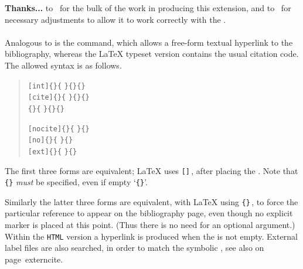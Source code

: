 \medskip
\noindent\textbf{Thanks...} to \Wilck\ for the bulk of the work 
in producing this extension, and to \RossMoore\ for 
necessary adjustments to allow it to work correctly with the 
.


%
\paragraph*{\label{hypercite}}
Analogous to  is the  command,
which allows a free-form textual hyperlink to the bibliography,
whereas the \LaTeX{} typeset version contains the usual citation code.
The allowed syntax is as follows.
\begin{small}
\begin{quote}
\verb|[int]{|\verb|}{|%
\verb|}{|\verb|}{|\verb|}|\\
\verb|[cite]{|\verb|}{|%
\verb|}{|\verb|}{|\verb|}|\\
\verb|{|\verb|}{|%
\verb|}{|\verb|}{|\verb|}|\medskip

\verb|[nocite]{|\verb|}{|%
\verb|}{|\verb|}|\\
\verb|[no]{|\verb|}{|%
\verb|}{|\verb|}|\\
\verb|[ext]{|\verb|}{|%
\verb|}{|\verb|}|
\end{quote}
\end{small}
The first three forms are equivalent; 
\LaTeX{} uses \verb|[|\verb|]|\,,
after placing the .
Note that \verb|{|\verb|}| \emph{must} be specified, 
even if empty `\verb|{}|'.

Similarly the latter three forms are equivalent, 
with \LaTeX{} using \verb|{|\verb|}|\,, 
to force the particular reference to appear on the bibliography page, 
even though no explicit marker is placed at this point.
(Thus there is no need for an optional   argument.)\html{\\}
Within the \texttt{HTML} version a hyperlink is produced when the  
is not empty. External label files are also searched, 
in order to match the symbolic , see also 
\hyperref[page]{}{ on page~}{}{externcite}.

